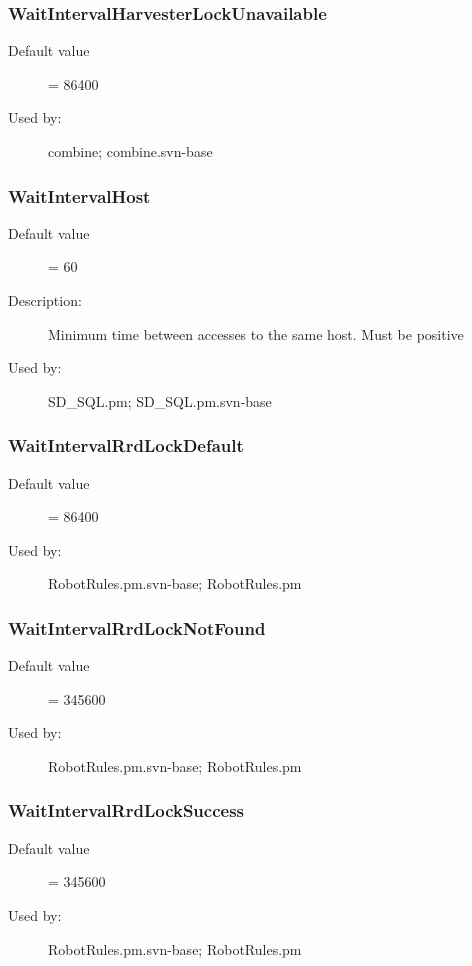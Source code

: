 \subsubsection{WaitIntervalHarvesterLockUnavailable}
\label{WaitIntervalHarvesterLockUnavailable}
\begin{description}
\item[Default value] = 86400
\item[Used by:] combine; combine.svn-base
\end{description}
\subsubsection{WaitIntervalHost}
\label{WaitIntervalHost}
\begin{description}
\item[Default value] = 60
\item[Description:] Minimum time between accesses to the same host. Must be positive
\item[Used by:] SD\_SQL.pm; SD\_SQL.pm.svn-base
\end{description}
\subsubsection{WaitIntervalRrdLockDefault}
\label{WaitIntervalRrdLockDefault}
\begin{description}
\item[Default value] = 86400
\item[Used by:] RobotRules.pm.svn-base; RobotRules.pm
\end{description}
\subsubsection{WaitIntervalRrdLockNotFound}
\label{WaitIntervalRrdLockNotFound}
\begin{description}
\item[Default value] = 345600
\item[Used by:] RobotRules.pm.svn-base; RobotRules.pm
\end{description}
\subsubsection{WaitIntervalRrdLockSuccess}
\label{WaitIntervalRrdLockSuccess}
\begin{description}
\item[Default value] = 345600
\item[Used by:] RobotRules.pm.svn-base; RobotRules.pm
\end{description}
